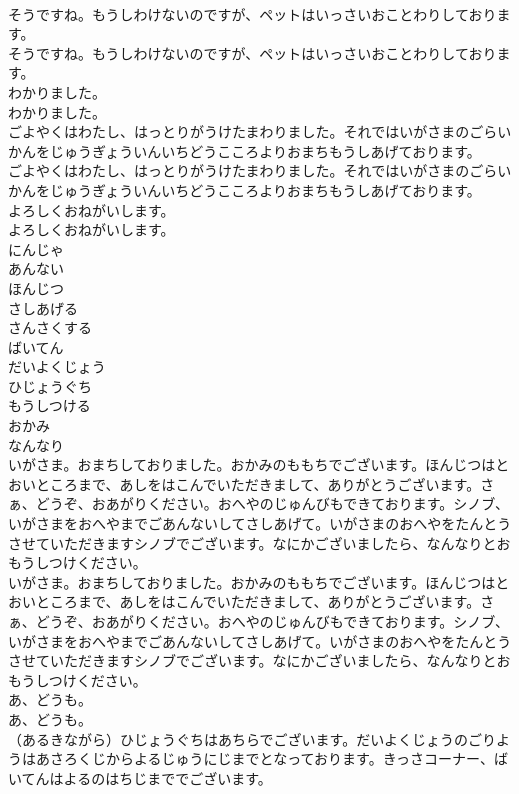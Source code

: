 \documentclass[8pt]{extreport}
\begin{document}
\begin{CJK}{UTF8}{min}
\\	そうですね。もうしわけないのですが、ペットはいっさいおことわりしております。
\\	そうですね。もうしわけないのですが、ペットはいっさいおことわりしております。
\\	わかりました。
\\	わかりました。
\\	ごよやくはわたし、はっとりがうけたまわりました。それではいがさまのごらいかんをじゅうぎょういんいちどうこころよりおまちもうしあげております。
\\	ごよやくはわたし、はっとりがうけたまわりました。それではいがさまのごらいかんをじゅうぎょういんいちどうこころよりおまちもうしあげております。
\\	よろしくおねがいします。
\\	よろしくおねがいします。
\\	にんじゃ
\\	あんない
\\	ほんじつ
\\	さしあげる
\\	さんさくする
\\	ばいてん
\\	だいよくじょう
\\	ひじょうぐち
\\	もうしつける
\\	おかみ
\\	なんなり
\\	いがさま。おまちしておりました。おかみのももちでございます。ほんじつはとおいところまで、あしをはこんでいただきまして、ありがとうございます。さぁ、どうぞ、おあがりください。おへやのじゅんびもできております。シノブ、いがさまをおへやまでごあんないしてさしあげて。いがさまのおへやをたんとうさせていただきますシノブでございます。なにかございましたら、なんなりとおもうしつけください。
\\	いがさま。おまちしておりました。おかみのももちでございます。ほんじつはとおいところまで、あしをはこんでいただきまして、ありがとうございます。さぁ、どうぞ、おあがりください。おへやのじゅんびもできております。シノブ、いがさまをおへやまでごあんないしてさしあげて。いがさまのおへやをたんとうさせていただきますシノブでございます。なにかございましたら、なんなりとおもうしつけください。
\\	あ、どうも。
\\	あ、どうも。
\\	（あるきながら）ひじょうぐちはあちらでございます。だいよくじょうのごりようはあさろくじからよるじゅうにじまでとなっております。きっさコーナー、ばいてんはよるのはちじまででございます。

\end{CJK}
\end{document}
